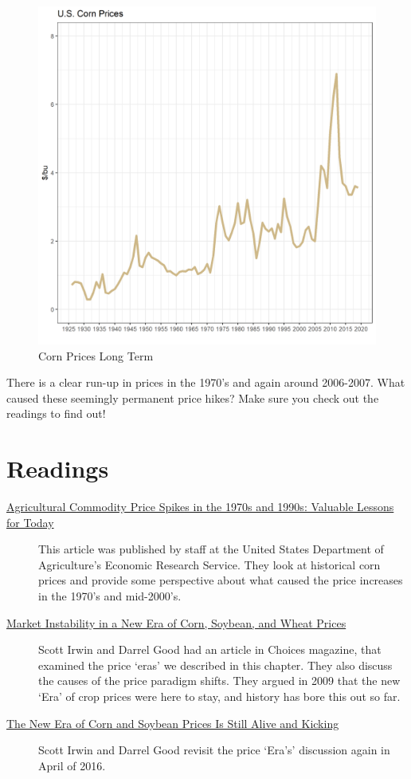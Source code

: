 \documentclass[
]{book}
\begin{document}
\begin{figure}
\centering
\includegraphics{assets/PrimerforGrain_CornPrices.png}
\caption{Corn Prices Long Term}
\end{figure}

There is a clear run-up in prices in the 1970's and again around 2006-2007. What caused these seemingly permanent price hikes? Make sure you check out the readings to find out!

\hypertarget{readings}{%
\section{Readings}\label{readings}}

\begin{description}
\item[\href{pdf-Readings/ers-amber-waves-2009-ag-com-pr-sp-1970s-1990s.pdf}{Agricultural Commodity Price Spikes in the 1970s and 1990s: Valuable Lessons for Today}]
This article was published by staff at the United States Department of Agriculture's Economic Research Service. They look at historical corn prices and provide some perspective about what caused the price increases in the 1970's and mid-2000's.
\item[\href{http://www.choicesmagazine.org/magazine/pdf/article_56.pdf}{Market Instability in a New Era of Corn, Soybean, and Wheat Prices}]
Scott Irwin and Darrel Good had an article in Choices magazine, that examined the price `eras' we described in this chapter. They also discuss the causes of the price paradigm shifts. They argued in 2009 that the new `Era' of crop prices were here to stay, and history has bore this out so far.
\item[\href{http://farmdocdaily.illinois.edu/2016/04/new-era-of-corn-and-soybean-prices.html}{The New Era of Corn and Soybean Prices Is Still Alive and Kicking}]
Scott Irwin and Darrel Good revisit the price `Era's' discussion again in April of 2016.
\end{description}
\end{document}

